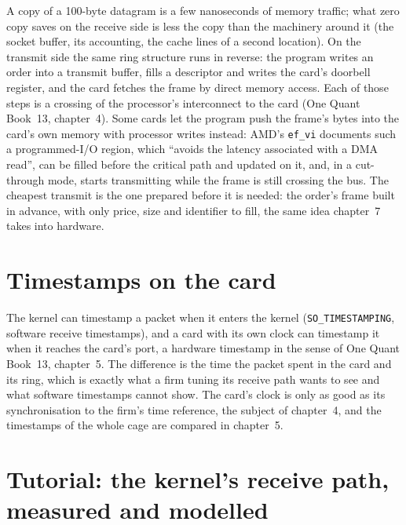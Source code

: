 A copy of a 100-byte datagram is a few nanoseconds of memory traffic; what zero copy saves on the receive side is less the copy than
the machinery around it (the socket buffer, its accounting, the cache lines of a second location). On the transmit side the same
ring structure runs in reverse: the program writes an order into a transmit buffer, fills a descriptor and writes the card's doorbell
register, and the card fetches the frame by direct memory access. Each of those steps is a crossing of the processor's interconnect to
the card (One Quant Book~13, chapter~4). Some cards let the program push the frame's bytes into the card's own memory with processor
writes instead: AMD's \texttt{ef\_vi} documents such a programmed-I/O region, which ``avoids the latency associated with a DMA read'',
can be filled before the critical path and updated on it, and, in a cut-through mode, starts transmitting while the frame is still
crossing the bus. The cheapest transmit is the one prepared before it is needed: the order's
frame built in advance, with only price, size and identifier to fill, the same idea chapter~7 takes into hardware.

\section{Timestamps on the card}

The kernel can timestamp a packet when it enters the kernel (\texttt{SO\_TIMESTAMPING}, software receive timestamps), and a card with
its own clock can timestamp it when it reaches the card's port, a hardware timestamp in the sense of One Quant Book~13, chapter~5. The
difference is the time the packet spent in the card and its ring, which is exactly what a firm tuning its receive path wants to see and
what software timestamps cannot show. The card's clock is only as good as its synchronisation to the firm's time reference, the
subject of chapter~4, and the timestamps of the whole cage are compared in chapter~5.

\section{Tutorial: the kernel's receive path, measured and modelled}\label{tut:nw:network-cards-and-kernel-bypass:tut}


